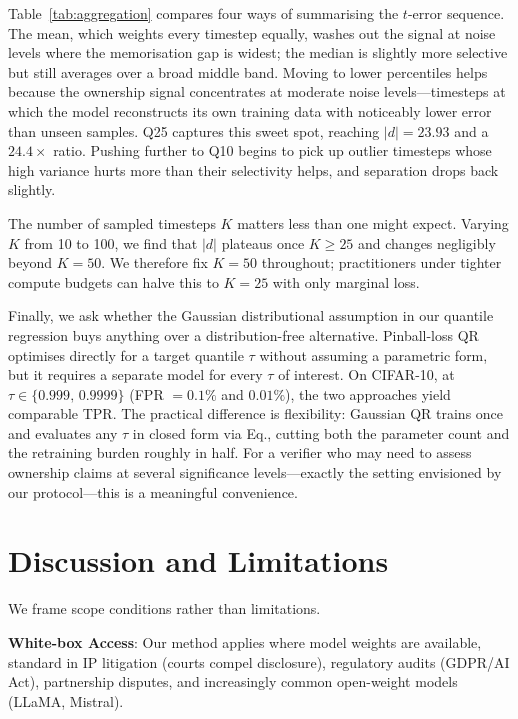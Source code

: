 \documentclass[sigconf, review, anonymous]{acmart}
\begin{document}
Table~\ref{tab:aggregation} compares four ways of summarising the
$t$-error sequence.  The mean, which weights every timestep equally,
washes out the signal at noise levels where the memorisation gap is
widest; the median is slightly more selective but still averages over
a broad middle band.  Moving to lower percentiles helps because the
ownership signal concentrates at moderate noise levels---timesteps at
which the model reconstructs its own training data with noticeably
lower error than unseen samples.  Q25 captures this sweet spot,
reaching $|d|=23.93$ and a $24.4\times$ ratio.  Pushing further to
Q10 begins to pick up outlier timesteps whose high variance hurts more
than their selectivity helps, and separation drops back slightly.

The number of sampled timesteps $K$ matters less than one might
expect.  Varying $K$ from 10 to 100, we find that $|d|$ plateaus once
$K\!\geq\!25$ and changes negligibly beyond $K\!=\!50$.  We therefore
fix $K\!=\!50$ throughout; practitioners under tighter compute budgets
can halve this to $K\!=\!25$ with only marginal loss.

Finally, we ask whether the Gaussian distributional assumption in our
quantile regression buys anything over a distribution-free
alternative.  Pinball-loss QR optimises directly for a target quantile
$\tau$ without assuming a parametric form, but it requires a separate
model for every $\tau$ of interest.  On CIFAR-10, at
$\tau\!\in\!\{0.999,\,0.9999\}$ (FPR $=0.1\%$ and $0.01\%$), the two
approaches yield comparable TPR.  The practical difference is
flexibility: Gaussian QR trains once and evaluates any $\tau$ in
closed form via Eq., cutting both the
parameter count and the retraining burden roughly in half.  For a
verifier who may need to assess ownership claims at several
significance levels---exactly the setting envisioned by our
protocol---this is a meaningful convenience.
\section{Discussion and Limitations}
\label{sec:discussion}

We frame scope conditions rather than limitations.

\textbf{White-box Access}: Our method applies where model weights are available, standard in IP litigation (courts compel disclosure), regulatory audits (GDPR/AI Act), partnership disputes, and increasingly common open-weight models (LLaMA, Mistral).
\end{document}
